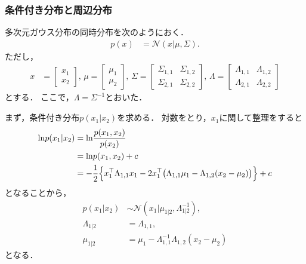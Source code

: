 \documentclass[11pt,a4paper]{jsarticle}
\begin{document}
\subsubsection{条件付き分布と周辺分布}
多次元ガウス分布の同時分布を次のようにおく．
\begin{align}
p(x)
& =
\mathcal{N} (x | \mu, \Sigma).
\end{align}
ただし，
\begin{align}
x
& =
\begin{bmatrix}
x_1 \\
x_2
\end{bmatrix}, \,
\mu =
\begin{bmatrix}
\mu_1 \\
\mu_2
\end{bmatrix}, \,
\Sigma =
\begin{bmatrix}
\Sigma_{1, 1} & \Sigma_{1, 2} \\
\Sigma_{2, 1} & \Sigma_{2, 2}
\end{bmatrix}, \,
\Lambda =
\begin{bmatrix}
\Lambda_{1, 1} & \Lambda_{1, 2} \\
\Lambda_{2, 1} & \Lambda_{2, 2}
\end{bmatrix}
\end{align}
とする．
ここで，$\Lambda = \Sigma^{-1}$とおいた．

まず，条件付き分布$p(x_1 | x_2)$を求める．
対数をとり，$x_1$に関して整理をすると
\begin{align}
\mathrm{ln} p(x_1 | x_2)
& =
\mathrm{ln} \frac{p(x_1, x_2)}{p(x_2)} \nonumber \\
& =
\mathrm{ln} p(x_1, x_2) + c \nonumber \\
& =
-\frac{1}{2} \Bigl\{ x_1^\top \Lambda_{1, 1} x_1
- 2 x_1^\top \bigl(\Lambda_{1, 1} \mu_1 - \Lambda_{1, 2} (x_2 - \mu_2) \bigr) \Bigr\} + c
\end{align}
となることから，
\begin{align}
p(x_1 | x_2)
& \sim\mathcal{N} (x_1 | \mu_{1|2}, \Lambda_{1|2}^{-1}), \\
\Lambda_{1|2}
& =
\Lambda_{1,1}, \\
\mu_{1|2}
& =
\mu_1 - \Lambda_{1,1}^{-1} \Lambda_{1,2} (x_2 - \mu_2)
\end{align}
となる．
\end{document}
